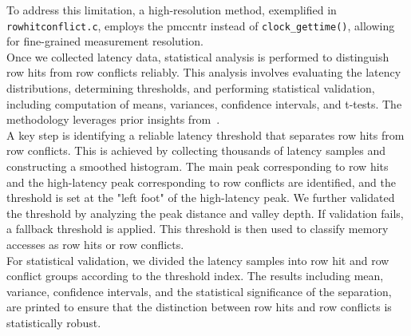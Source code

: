         To address this limitation, a high-resolution method, exemplified in 
        \texttt{rowhitconflict.c}, employs the \gls{pmccntr} instead of \texttt{clock\_gettime()}, allowing for fine-grained measurement 
        resolution.
        \\
        Once we collected latency data, statistical analysis is performed to distinguish row hits from row 
        conflicts reliably. This analysis involves evaluating the latency distributions, determining thresholds, 
        and performing statistical validation, including computation of means, variances, confidence intervals, 
        and t-tests. The methodology leverages prior insights from~\cite{paperDRAMA,paperKnockKnock}.
        \\
        A key step is identifying a reliable latency threshold that separates row hits from row conflicts. This 
        is achieved by collecting thousands of latency samples and constructing a smoothed histogram. The main 
        peak corresponding to row hits and the high-latency peak corresponding to row conflicts are identified, 
        and the threshold is set at the "left foot" of the high-latency peak. We further validated the threshold  
        by analyzing the peak distance and valley depth. If validation fails, a fallback threshold is applied. 
        This threshold is then used to classify memory accesses as row hits or row conflicts.
        \\
        For statistical validation, we divided the latency samples into row hit and row conflict groups according 
        to the threshold index.
        The results including mean, variance, confidence intervals, and the statistical significance 
        of the separation, are printed to ensure that the distinction between row hits and row conflicts is 
        statistically robust.

